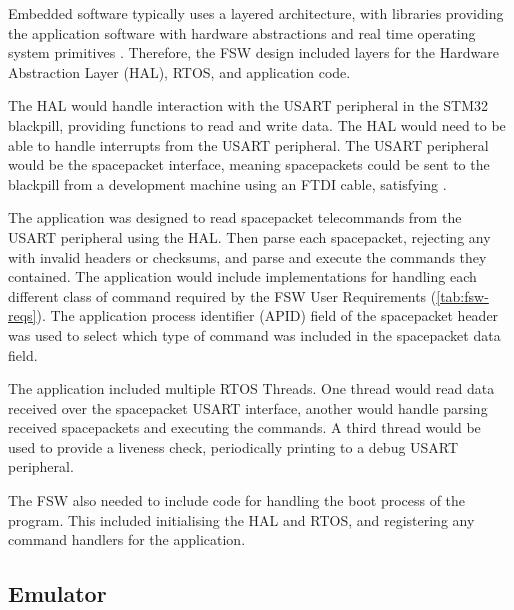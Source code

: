 \documentclass[../report.tex]{subfiles}
\begin{document}
Embedded software typically uses a layered architecture, with libraries
providing the application software with hardware abstractions and real time
operating system primitives \citep{Cratere_2024}. Therefore, the FSW design
included layers for the Hardware Abstraction Layer (HAL), RTOS, and application
code.

The HAL would handle interaction with the USART peripheral in the STM32
blackpill, providing functions to read and write data. The HAL would need to be
able to handle interrupts from the USART peripheral. The USART peripheral would
be the spacepacket interface, meaning spacepackets could be sent to the
blackpill from a development machine using an FTDI cable, satisfying
.

The application was designed to read spacepacket telecommands from the USART
peripheral using the HAL. Then parse each spacepacket, rejecting any with
invalid headers or checksums, and parse and execute the commands they
contained. The application would include implementations for handling each
different class of command required by the FSW User Requirements
(\autoref{tab:fsw-reqs}). The application process identifier (APID) field of
the spacepacket header \citep{Ccsds_spp} was used to select which type of
command was included in the spacepacket data field.

The application included multiple RTOS Threads. One thread would read
data received over the spacepacket USART interface, another would handle
parsing received spacepackets and executing the commands. A third thread would
be used to provide a liveness check, periodically printing to a debug USART
peripheral.

The FSW also needed to include code for handling the boot process of the
program. This included initialising the HAL and RTOS, and registering any
command handlers for the application.

\subsection{Emulator}


\end{document}
